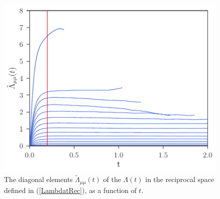 \documentclass[b5paper,openright,10pt]{book}
\begin{document}
\begin{figure}[h!]
  \centering
\includegraphics[scale=0.41]{LambdatRec-WALLS-17nodes}
\caption[Diagonal elements  $\tilde{\Lambda}_{\mu\mu}(t)$ of $\Lambda(t)$ in the reciprocal space for a confined fluid - Thick bins]{The  diagonal elements  $\tilde{\Lambda}_{\mu\mu}(t)$ of  the
  $\Lambda(t)$ in the reciprocal space defined in (\ref{LambdatRec}), as a
  function of $t$.}
\label{fig:LambdatRec-WALLS-17nodes}
\end{figure}
\end{document}
